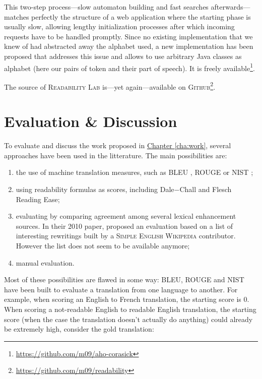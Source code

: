 \documentclass[a4paper, 11pt, onepage]{scrreprt}
\newcommand\sew{\textsc{Simple English Wikipedia}}
\newcommand\chapterref[1]{\hyperref[#1]{Chapter \ref*{#1}}}
\begin{document}
This two-step process—slow automaton building and fast searches
afterwards—matches perfectly the structure of a web application where
the starting phase is usually slow, allowing lengthy initialization
processes after which incoming requests have to be handled
promptly. Since no existing implementation that we knew of had
abstracted away the alphabet used, a new implementation has been
proposed that addresses this issue and allows to use arbitrary Java
classes as alphabet (here our pairs of token and their part of
speech). It is freely
available\footnote{\url{https://github.com/m09/aho-corasick}}.

The source of \textsc{Readability Lab} is—yet again—available on
\textsc{Github}\footnote{\url{https://github.com/m09/readability}}.

\chapter{Evaluation \& Discussion}
\label{cha:discussion}

To evaluate and discuss the work proposed in \chapterref{cha:work},
several approaches have been used in the litterature. The main
possibilities are:

\begin{enumerate}
\item the use of machine translation measures, such as BLEU
  \cite{papineni2002bleu}, ROUGE \cite{lin2004rouge} or NIST
  \cite{doddington2002automatic};
\item using readability formulas as scores, including Dale−Chall and
  Flesch Reading Ease;
\item evaluating by comparing agreement among several lexical
  enhancement sources. In their 2010 paper, \cite{yatskar2010sake}
  proposed an evaluation based on a list of interesting rewritings
  built by a \sew{} contributor. However the list does not seem to be
  available anymore;
\item manual evaluation.
\end{enumerate}

Most of these possibilities are flawed in some way: BLEU, ROUGE and
NIST have been built to evaluate a translation from one language to
another. For example, when scoring an English to French translation,
the starting score is $0$. When scoring a not-readable English to
readable English translation, the starting score (when the case the
translation doesn't actually do anything) could already be extremely
high, consider the gold translation:
\end{document}
